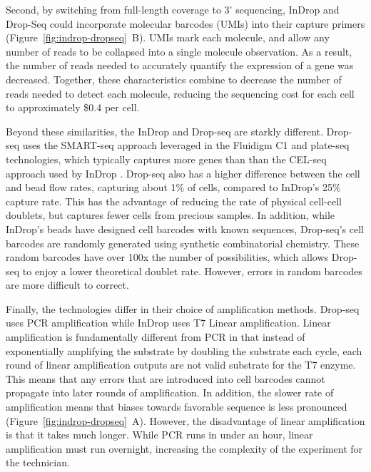 Second, by switching from full-length coverage to 3' sequencing, InDrop and Drop-Seq could incorporate molecular barcodes (UMIs) into their capture primers (Figure~\ref{fig:indrop-dropseq}~B).
UMIs mark each molecule, and allow any number of reads to be collapsed into a single molecule observation. 
As a result, the number of reads needed to accurately quantify the expression of a gene was decreased. 
Together, these characteristics combine to decrease the number of reads needed to detect each molecule, reducing the sequencing cost for each cell to approximately \$0.4 per cell.

Beyond these similarities, the InDrop and Drop-seq are starkly different. 
Drop-seq uses the SMART-seq approach leveraged in the Fluidigm C1 and plate-seq technologies, which typically captures more genes than than the CEL-seq approach used by InDrop \citep{Ziegenhain2017}. 
Drop-seq also has a higher difference between the cell and bead flow rates, capturing about 1\% of cells, compared to InDrop’s 25\% capture rate. 
This has the advantage of reducing the rate of physical cell-cell doublets, but captures fewer cells from precious samples. 
In addition, while InDrop’s beads have designed cell barcodes with known sequences, Drop-seq’s cell barcodes are randomly generated using synthetic combinatorial chemistry. 
These random barcodes have over 100x the number of possibilities, which allows Drop-seq to enjoy a lower theoretical doublet rate. 
However, errors in random barcodes are more difficult to correct. 

Finally, the technologies differ in their choice of amplification methods. 
Drop-seq uses PCR amplification while InDrop uses T7 Linear amplification. 
Linear amplification is fundamentally different from PCR in that instead of exponentially amplifying the substrate by doubling the substrate each cycle, each round of linear amplification outputs are not valid substrate for the T7 enzyme. 
This means that any errors that are introduced into cell barcodes cannot propagate into later rounds of amplification. 
In addition, the slower rate of amplification means that biases towards favorable sequence is less pronounced (Figure~\ref{fig:indrop-dropseq}~A). 
However, the disadvantage of linear amplification is that it takes much longer. 
While PCR runs in under an hour, linear amplification must run overnight, increasing the complexity of the experiment for the technician. 

